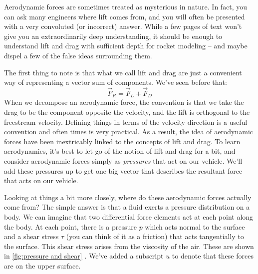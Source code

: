 \documentclass[10pt, openany, titlepage]{book}
\theoremstyle{definition}
\let\oldautoref\autoref
\renewcommand{\autoref}[1]{%
  \begingroup
  \hypersetup{linkcolor=black}%
  \oldautoref{#1}%
  \endgroup
}
\begin{document}
Aerodynamic forces are sometimes treated as mysterious in nature. In fact, you can ask many engineers where lift comes from, and you will often be presented with a very convoluted (or incorrect) answer. While a few pages of text won't give you an extraordinarily deep understanding, it should be enough to understand lift and drag with sufficient depth for rocket modeling -- and maybe dispel a few of the false ideas surrounding them.

The first thing to note is that what we call lift and drag are just a convenient way of representing a vector sum of components. We've seen before that:
$$\vec{F}_R=\vec{F}_L+\vec{F}_D$$
When we decompose an aerodynamic force, the convention is that we take the drag to be the component opposite the velocity, and the lift is orthogonal to the freestream velocity. Defining things in terms of the velocity direction is a useful convention and often times is very practical. As a result, the idea of aerodynamic forces have been inextricably linked to the concepts of lift and drag. To learn aerodynamics, it's best to let go of the notion of lift and drag for a bit, and consider aerodynamic forces simply as \textit{pressures} that act on our vehicle. We'll add these pressures up to get one big vector that describes the resultant force that acts on our vehicle.

Looking at things a bit more closely, where do these aerodynamic forces actually come from? The simple answer is that a fluid exerts a pressure distribution on a body. We can imagine that two differential force elements act at each point along the body. At each point, there is a pressure $p$ which acts normal to the surface and a shear stress $\tau$ (you can think of it as a friction) that acts tangentially to the surface. This shear stress arises from the viscosity of the air. These are shown in \autoref{fig:pressure and shear}.  We've added a subscript $u$ to denote that these forces are on the upper surface.
\end{document}
